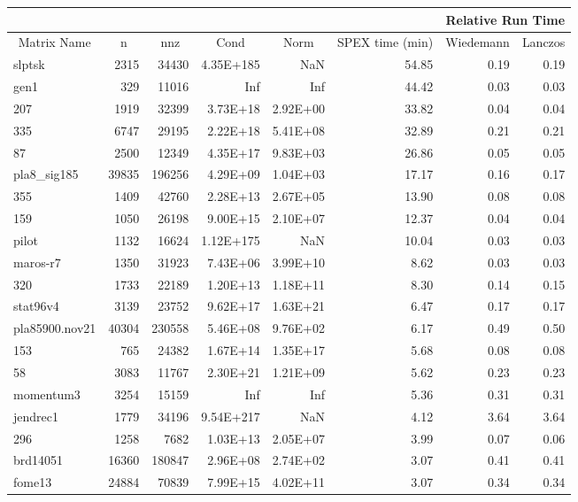\documentclass[10pt]{article}
\begin{document}
\begin{longtable}{|l|r|r|r|r|r|r|r|}
\hline	
& & & & & & \multicolumn{2}{c|}{Relative Run Time}  \\ \hline
\multicolumn{1}{|c|}{Matrix Name}	& \multicolumn{1}{c|}{n} & \multicolumn{1}{c|}{nnz} & \multicolumn{1}{c|}{Cond} & \multicolumn{1}{c|}{Norm}  & \multicolumn{1}{c|}{SPEX time (min)} & \multicolumn{1}{c|}{Wiedemann} & \multicolumn{1}{c|}{Lanczos} \\  \hline \endhead
slptsk	&	2315	&	34430	&	4.35E+185	&	NaN	&	54.85	&	0.19	&	0.19	\\
gen1	&	329	&	11016	&	Inf	&	Inf	&	44.42	&	0.03	&	0.03	\\
207	&	1919	&	32399	&	3.73E+18	&	2.92E+00	&	33.82	&	0.04	&	0.04	\\
335	&	6747	&	29195	&	2.22E+18	&	5.41E+08	&	32.89	&	0.21	&	0.21	\\
87	&	2500	&	12349	&	4.35E+17	&	9.83E+03	&	26.86	&	0.05	&	0.05	\\
pla8\_sig185	&	39835	&	196256	&	4.29E+09	&	1.04E+03	&	17.17	&	0.16	&	0.17	\\
355	&	1409	&	42760	&	2.28E+13	&	2.67E+05	&	13.90	&	0.08	&	0.08	\\
159	&	1050	&	26198	&	9.00E+15	&	2.10E+07	&	12.37	&	0.04	&	0.04	\\
pilot	&	1132	&	16624	&	1.12E+175	&	NaN	&	10.04	&	0.03	&	0.03	\\
maros-r7	&	1350	&	31923	&	7.43E+06	&	3.99E+10	&	8.62	&	0.03	&	0.03	\\
320	&	1733	&	22189	&	1.20E+13	&	1.18E+11	&	8.30	&	0.14	&	0.15	\\
stat96v4	&	3139	&	23752	&	9.62E+17	&	1.63E+21	&	6.47	&	0.17	&	0.17	\\
pla85900.nov21	&	40304	&	230558	&	5.46E+08	&	9.76E+02	&	6.17	&	0.49	&	0.50	\\
153	&	765	&	24382	&	1.67E+14	&	1.35E+17	&	5.68	&	0.08	&	0.08	\\
58	&	3083	&	11767	&	2.30E+21	&	1.21E+09	&	5.62	&	0.23	&	0.23	\\
momentum3	&	3254	&	15159	&	Inf	&	Inf	&	5.36	&	0.31	&	0.31	\\
jendrec1	&	1779	&	34196	&	9.54E+217	&	NaN	&	4.12	&	3.64	&	3.64	\\
296	&	1258	&	7682	&	1.03E+13	&	2.05E+07	&	3.99	&	0.07	&	0.06	\\
brd14051	&	16360	&	180847	&	2.96E+08	&	2.74E+02	&	3.07	&	0.41	&	0.41	\\
fome13	&	24884	&	70839	&	7.99E+15	&	4.02E+11	&	3.07	&	0.34	&	0.34	\\

\end{longtable}
\end{document}
